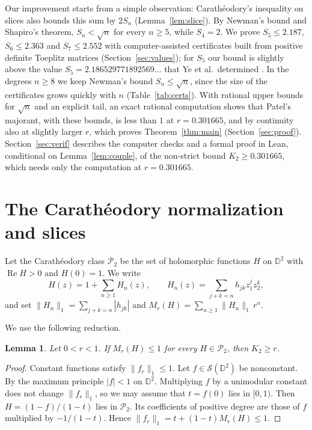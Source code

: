 \documentclass[11pt]{amsart}
\newtheorem{lemma}[theorem]{Lemma}
\theoremstyle{remark}
\numberwithin{equation}{section}
\newcommand{\D}{\mathbb{D}}
\newcommand{\Pclass}{\mathcal{P}_2}
\newcommand{\Kbound}{0.301665}
\newcommand{\YeVal}{2.186529771892569\ldots}
\newcommand{\FiveOwn}{2.187}
\newcommand{\SixOwn}{2.363}
\newcommand{\SevenOwn}{2.552}
\begin{document}
Our improvement starts from a simple observation: Carath\'eodory's inequality on slices also bounds this sum by $2S_n$ (Lemma~\ref{lem:slice}). By Newman's bound and Shapiro's theorem, $S_n<\sqrt n$ for every $n\ge5$, while $S_4=2$. We prove $S_5\le\FiveOwn$, $S_6\le\SixOwn$ and $S_7\le\SevenOwn$ with computer-assisted certificates built from positive definite Toeplitz matrices (Section~\ref{sec:values}); for $S_5$ our bound is slightly above the value $S_5=\YeVal$ that Ye et al.\ determined \cite{Ye26}. In the degrees $n\ge8$ we keep Newman's bound $S_n\le\sqrt n$, since the size of the certificates grows quickly with $n$ (Table~\ref{tab:certs}). With rational upper bounds for $\sqrt n$ and an explicit tail, an exact rational computation shows that Patel's majorant, with these bounds, is less than $1$ at $r=\Kbound$, and by continuity also at slightly larger $r$, which proves Theorem~\ref{thm:main} (Section~\ref{sec:proof}). Section~\ref{sec:verif} describes the computer checks and a formal proof in Lean, conditional on Lemma~\ref{lem:couple}, of the non-strict bound $K_2\ge\Kbound$, which needs only the computation at $r=\Kbound$.

\section{The Carath\'eodory normalization and slices}\label{sec:setup}

Let the Carath\'eodory class $\Pclass$ be the set of holomorphic functions $H$ on $\D^2$ with $\operatorname{Re}H>0$ and $H(0)=1$. We write
\[
H(z)=1+\sum_{n\ge1}H_n(z),\qquad H_n(z)=\sum_{j+k=n}h_{jk}z_1^jz_2^k,
\]
and set $\|H_n\|_1=\sum_{j+k=n}|h_{jk}|$ and $M_r(H)=\sum_{n\ge1}\|H_n\|_1\,r^n$.

We use the following reduction.

\begin{lemma}\label{lem:norm}
Let $0<r<1$. If $M_r(H)\le1$ for every $H\in\Pclass$, then $K_2\ge r$.
\end{lemma}

\begin{proof}
Constant functions satisfy $\|f_r\|_1\le1$. Let $f\in\mathcal S(\D^2)$ be nonconstant. By the maximum principle $|f|<1$ on $\D^2$. Multiplying $f$ by a unimodular constant does not change $\|f_r\|_1$, so we may assume that $t=f(0)$ lies in $[0,1)$. Then $H=(1-f)/(1-t)$ lies in $\Pclass$. Its coefficients of positive degree are those of $f$ multiplied by $-1/(1-t)$. Hence $\|f_r\|_1=t+(1-t)M_r(H)\le1$.
\end{proof}
\end{document}
